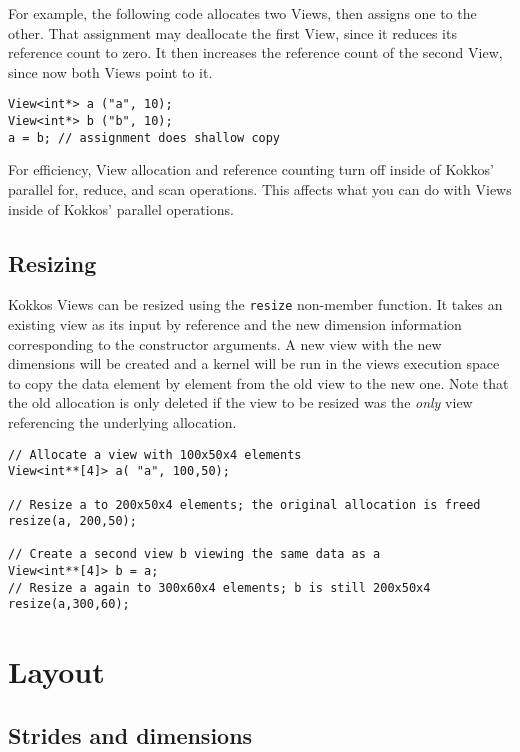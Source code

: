 For example, the following code allocates two Views, then assigns one
to the other.  That assignment may deallocate the first View, since it
reduces its reference count to zero.  It then increases the reference
count of the second View, since now both Views point to it.
\begin{lstlisting}
View<int*> a ("a", 10);
View<int*> b ("b", 10);
a = b; // assignment does shallow copy
\end{lstlisting}

For efficiency, View allocation and reference counting turn off inside
of Kokkos' parallel for, reduce, and scan operations.  This affects
what you can do with Views inside of Kokkos' parallel operations.

\subsection{Resizing}

Kokkos Views can be resized using the \lstinline|resize| non-member function.
It takes an existing view as its input by reference and the new dimension information
corresponding to the constructor arguments. A new view with the new dimensions will
be created and a kernel will be run in the views execution space to copy the data 
element by element from the old view to the new one. Note that the old allocation is 
only deleted if the view to be resized was the {\it only} view referencing the underlying 
allocation. 

\begin{lstlisting}
// Allocate a view with 100x50x4 elements 
View<int**[4]> a( "a", 100,50);

// Resize a to 200x50x4 elements; the original allocation is freed
resize(a, 200,50);

// Create a second view b viewing the same data as a
View<int**[4]> b = a;
// Resize a again to 300x60x4 elements; b is still 200x50x4
resize(a,300,60);
\end{lstlisting} 
 




\section{Layout}\label{S:View:Layout}

\subsection{Strides and dimensions}\label{SS:View:Layout:Strides}

